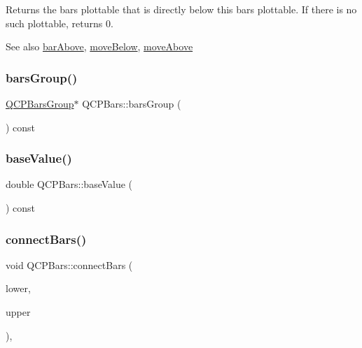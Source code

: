 Returns the bars plottable that is directly below this bars plottable. If there is no such plottable, returns 0.

\begin{DoxySeeAlso}{See also}
\hyperlink{class_q_c_p_bars_ab97f2acd9f6cb40d2cc3c33d278f0e78}{bar\+Above}, \hyperlink{class_q_c_p_bars_a69fc371346980f19177c3d1ecdad78ee}{move\+Below}, \hyperlink{class_q_c_p_bars_ac22e00a6a41509538c21b04f0a57318c}{move\+Above} 
\end{DoxySeeAlso}
\mbox{\label{class_q_c_p_bars_a5eef59840b68d205df4e0c3df5f97633}} 
\subsubsection{\texorpdfstring{bars\+Group()}{barsGroup()}}
{\footnotesize\ttfamily \hyperlink{class_q_c_p_bars_group}{Q\+C\+P\+Bars\+Group}$\ast$ Q\+C\+P\+Bars\+::bars\+Group (\begin{DoxyParamCaption}{ }\end{DoxyParamCaption}) const\hspace{0.3cm}{\ttfamily [inline]}}

\mbox{\label{class_q_c_p_bars_a29a7b3b86f80b2a04bd1f9ec0ebaf422}} 
\subsubsection{\texorpdfstring{base\+Value()}{baseValue()}}
{\footnotesize\ttfamily double Q\+C\+P\+Bars\+::base\+Value (\begin{DoxyParamCaption}{ }\end{DoxyParamCaption}) const\hspace{0.3cm}{\ttfamily [inline]}}

\mbox{\label{class_q_c_p_bars_a6ea37802cd22f97235cab614b14b9f19}} 
\subsubsection{\texorpdfstring{connect\+Bars()}{connectBars()}}
{\footnotesize\ttfamily void Q\+C\+P\+Bars\+::connect\+Bars (\begin{DoxyParamCaption}\item[{\hyperlink{class_q_c_p_bars}{Q\+C\+P\+Bars} $\ast$}]{lower,  }\item[{\hyperlink{class_q_c_p_bars}{Q\+C\+P\+Bars} $\ast$}]{upper }\end{DoxyParamCaption})\hspace{0.3cm}{\ttfamily [static]}, {\ttfamily [protected]}}

